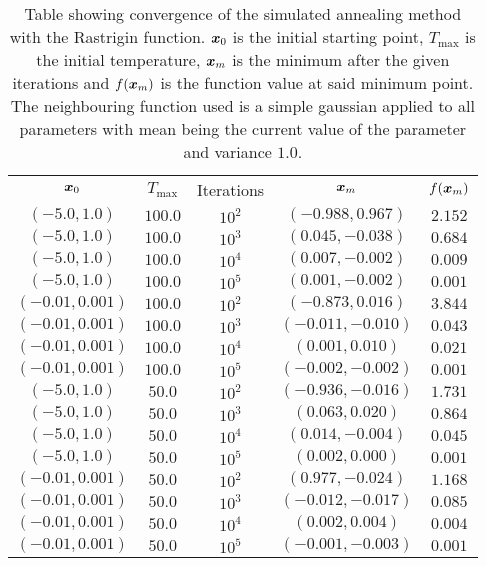         \begin{table}[H]
            \centering
            \setlength{\tabcolsep}{23.0pt}
            \caption{Table showing convergence of the simulated annealing
            method with the Rastrigin function. $\boldsymbol{{x}}_0$ is the initial
            starting point, $T_{\text{max}}$ is the initial temperature,
            $\boldsymbol{{x}}_m$ is the minimum after the given iterations and
            $f(\boldsymbol{{x}}_m)$ is the function value at said minimum point. The
            neighbouring function used is a simple gaussian applied to all
            parameters with mean being the current value of the parameter and
            variance $1.0$.}
            \label{tab:rastriginconv}
            \begin{tabular}{ccccc} \hline\hline
                $\boldsymbol{{x}}_0$ & $T_{\text{max}}$ & Iterations & $\boldsymbol{{x}}_m$ & $f(\boldsymbol{{x}}_m)$ \\
                $(-5.0,1.0)$ & $100.0$ & $10^2$ & $(-0.988,0.967)$ & $2.152$ \\
                $(-5.0,1.0)$ & $100.0$ & $10^3$ & $(0.045,-0.038)$ & $0.684$ \\
                $(-5.0,1.0)$ & $100.0$ & $10^4$ & $(0.007,-0.002)$ & $0.009$ \\
                $(-5.0,1.0)$ & $100.0$ & $10^5$ & $(0.001,-0.002)$ & $0.001$ \\
                $(-0.01,0.001)$ & $100.0$ & $10^2$ & $(-0.873,0.016)$ & $3.844$ \\
                $(-0.01,0.001)$ & $100.0$ & $10^3$ & $(-0.011,-0.010)$ & $0.043$ \\
                $(-0.01,0.001)$ & $100.0$ & $10^4$ & $(0.001,0.010)$ & $0.021$ \\
                $(-0.01,0.001)$ & $100.0$ & $10^5$ & $(-0.002,-0.002)$ & $0.001$ \\
                $(-5.0,1.0)$ & $50.0$ & $10^2$ & $(-0.936,-0.016)$ & $1.731$ \\
                $(-5.0,1.0)$ & $50.0$ & $10^3$ & $(0.063,0.020)$ & $0.864$ \\
                $(-5.0,1.0)$ & $50.0$ & $10^4$ & $(0.014,-0.004)$ & $0.045$ \\
                $(-5.0,1.0)$ & $50.0$ & $10^5$ & $(0.002,0.000)$ & $0.001$ \\
                $(-0.01,0.001)$ & $50.0$ & $10^2$ & $(0.977,-0.024)$ & $1.168$ \\
                $(-0.01,0.001)$ & $50.0$ & $10^3$ & $(-0.012,-0.017)$ & $0.085$ \\
                $(-0.01,0.001)$ & $50.0$ & $10^4$ & $(0.002,0.004)$ & $0.004$ \\
                $(-0.01,0.001)$ & $50.0$ & $10^5$ & $(-0.001,-0.003)$ & $0.001$ \\ \hline\hline
            \end{tabular}
        \end{table}

